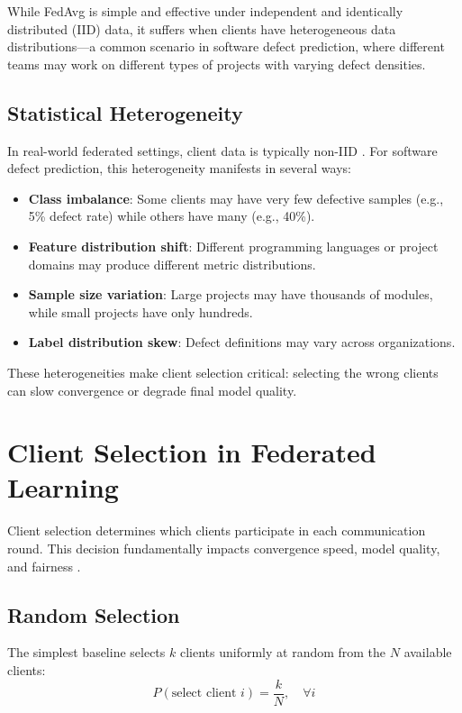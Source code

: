 While FedAvg is simple and effective under independent and identically distributed (IID) data, it suffers when clients have heterogeneous data distributions—a common scenario in software defect prediction, where different teams may work on different types of projects with varying defect densities.

\subsection{Statistical Heterogeneity}

In real-world federated settings, client data is typically non-IID \citep{li2020federated}. For software defect prediction, this heterogeneity manifests in several ways:

\begin{itemize}
    \item \textbf{Class imbalance}: Some clients may have very few defective samples (e.g., 5\% defect rate) while others have many (e.g., 40\%).
    \item \textbf{Feature distribution shift}: Different programming languages or project domains may produce different metric distributions.
    \item \textbf{Sample size variation}: Large projects may have thousands of modules, while small projects have only hundreds.
    \item \textbf{Label distribution skew}: Defect definitions may vary across organizations.
\end{itemize}

These heterogeneities make client selection critical: selecting the wrong clients can slow convergence or degrade final model quality.

\section{Client Selection in Federated Learning}

Client selection determines which clients participate in each communication round. This decision fundamentally impacts convergence speed, model quality, and fairness \citep{cho2020power}.

\subsection{Random Selection}

The simplest baseline selects \(k\) clients uniformly at random from the \(N\) available clients:
\[
P(\text{select client } i) = \frac{k}{N}, \quad \forall i
\]

